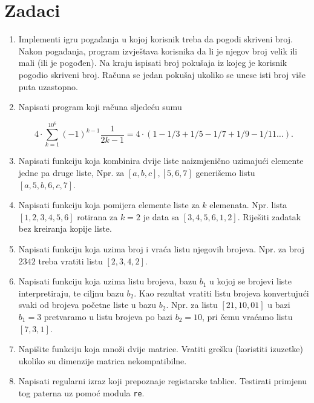 \section{Zadaci}
\begin{enumerate}
    
    \item Implementi igru pogađanja u kojoj korisnik treba da pogodi skriveni broj. Nakon pogađanja, program izvještava korisnika da li je njegov broj velik ili mali (ili je pogođen). Na kraju ispisati broj  pokušaja iz kojeg je korisnik pogodio skriveni broj. Računa se jedan pokušaj ukoliko se unese isti broj više puta uzastopno.
    
    
	\item Napisati program koji računa sljedeću sumu  
	
	$$ 4 \cdot \sum_{k=1}^{10^6}(-1)^{k-1} \frac{1}{2k-1}= 4 \cdot (1-1/3 + 1/5-1/7+1/9-1/11 \ldots).$$
	
	\item Napisati funkciju koja kombinira dvije liste naizmjenično uzimajući elemente jedne pa druge liste, Npr. za $[a,b,c], [5, 6, 7]$ generišemo listu $[a,5,b,6,c,7]$.
	
	\item Napisati funkciju koja pomijera elemente liste za $k$ elemenata. Npr. lista  $[1,2,3,4,5,6]$ rotirana za $k=2$ je data sa $[3,4,5,6,1,2]$. Riješiti zadatak bez kreiranja kopije liste. 
	
	\item Napisati funkciju koja uzima broj i vraća listu njegovih brojeva. Npr. za broj $2342$ treba vratiti listu $[2,3,4,2]$.
	
	\item Napisati funkciju koja uzima listu brojeva,   bazu $b_1$ u kojoj se brojevi liste interpretiraju, te ciljnu bazu $b_2$.  Kao rezultat vratiti listu brojeva konvertujući svaki od brojeva početne liste u bazu $b_2$. Npr. za listu $[21,10,01]$ u bazi $b_1 = 3$ pretvaramo u listu brojeva po bazi $b_2=10$, pri čemu vraćamo listu $[7,3, 1]$.
	
	\item Napišite funkciju koja množi dvije matrice. Vratiti grešku (koristiti izuzetke) ukoliko su dimenzije matrica nekompatibilne.  
	 
	\item Napisati regularni izraz koji prepoznaje registarske tablice. Testirati primjenu tog paterna uz pomoć modula \texttt{re}.
	

\end{enumerate}
